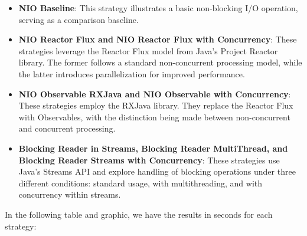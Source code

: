 \begin{itemize}
    \item \textbf{NIO Baseline}: This strategy illustrates a basic non-blocking I/O operation, serving as a comparison baseline.
    \item \textbf{NIO Reactor Flux and NIO Reactor Flux with Concurrency}: These strategies leverage the Reactor Flux model from Java's Project Reactor library. The former follows a standard non-concurrent processing model, while the latter introduces parallelization for improved performance.
    \item \textbf{NIO Observable RXJava and NIO Observable with Concurrency}: These strategies employ the RXJava library. They replace the Reactor Flux with Observables, with the distinction being made between non-concurrent and concurrent processing.
    \item \textbf{Blocking Reader in Streams, Blocking Reader MultiThread, and Blocking Reader Streams with Concurrency}: These strategies use Java's Streams API and explore handling of blocking operations under three different conditions: standard usage, with multithreading, and with concurrency within streams.
    
\end{itemize}


In the following table and graphic, we have the results in seconds for each strategy:

\begin{table}[H]
    \centering
    \caption{Processing times for different Java/Kotlin strategies for "Biggest Word".}
    \label{tab:strategies_times_biggest_word}
    \end{table}
    
